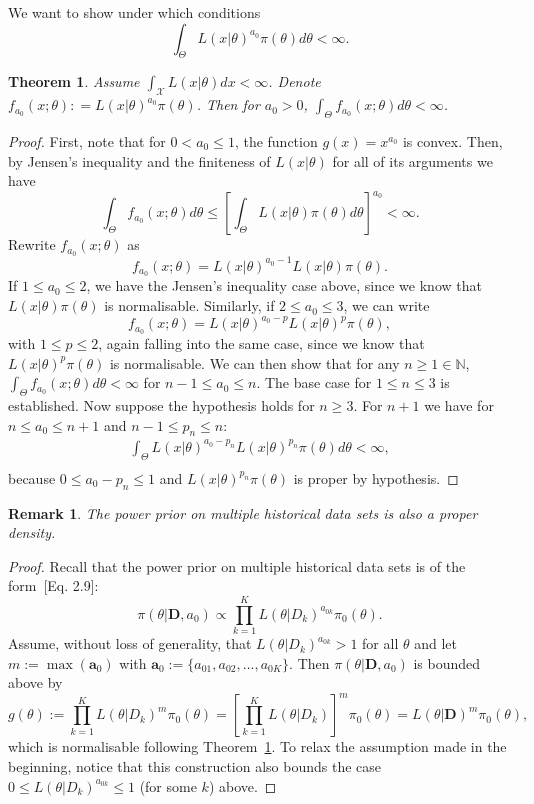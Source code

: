 \documentclass[a4paper, notitlepage, 11pt]{article}
\newtheorem{theorem}{Theorem}[]
\newtheorem{remark}{Remark}[]
\begin{document}
We want to show under which conditions
\[\int_{\Theta} L(x | \theta)^{a_0}\pi(\theta) d\theta <\infty.\]
\begin{theorem}
\label{thm:integrability}
 Assume $\int_{\mathcal{X}} L(x | \theta)dx < \infty$.
 Denote $f_{a_0}(x;\theta) : = L(x | \theta)^{a_0}\pi(\theta)$.
 Then for $a_0 > 0$, $\int_{\Theta} f_{a_0}(x;\theta) d\theta <\infty$.
\end{theorem}
\begin{proof}
First, note that for $0 < a_0 \leq 1$, the function $g(x) = x^{a_0}$ is convex.
Then, by Jensen's inequality and the finiteness of $L(x | \theta)$ for all of its arguments we have
\[ \int_{\Theta} f_{a_0}(x; \theta) d\theta \leq \left[ \int_{\Theta} L(x|\theta)\pi(\theta)d\theta \right]^{a_0} < \infty. \]
Rewrite $f_{a_0}(x; \theta)$ as
\[ f_{a_0}(x; \theta) = L(x|\theta)^{a_0 -1} L(x|\theta)\pi(\theta). \]
If $1 \leq a_0 \leq 2$, we have the Jensen's inequality case above, since we know that $L(x|\theta)\pi(\theta)$ is normalisable.
Similarly, if $2 \leq a_0 \leq 3$, we can write 
\[  f_{a_0}(x; \theta) = L(x|\theta)^{a_0-p} L(x|\theta)^p\pi(\theta), \]
with $1 \leq p \leq 2$, again falling into the same case, since we know that $L(x|\theta)^{p}\pi(\theta)$ is normalisable.
We can then show that for any $n \geq 1 \in \mathbb{N}$, $\int_{\Theta}f_{a_0}(x; \theta)d\theta < \infty$ for  $n-1 \leq a_0 \leq n$.
The base case for $1 \leq n \leq 3$ is established.
Now suppose the hypothesis holds for $n \geq 3$.
For $n + 1$ we have for $ n \leq  a_0 \leq n + 1$ and $n-1 \leq p_n \leq n$:
\begin{align*}
 \int_{\Theta} L(x|\theta)^{a_0-p_n} L(x|\theta)^{p_n}\pi(\theta)d\theta < \infty, \\
\end{align*}
because $0 \leq a_0 - p_n \leq 1$ and $L(x|\theta)^{p_n}\pi(\theta)$ is proper by hypothesis.
\end{proof}
\begin{remark}
 The power prior on multiple historical data sets is also a proper density.
\end{remark}
\begin{proof}
 Recall that the power prior on multiple historical data sets is of the form~[Eq. 2.9]\citep{Ibrahim2015}:
 \[ \pi(\theta | \boldsymbol D, a_0) \propto \prod_{k=1}^K L(\theta | D_k)^{a_{0k}} \pi_0(\theta). \]
Assume, without loss of generality, that $L(\theta |  D_k)^{a_{0k}} > 1$ for all $\theta$ and let $m := \max(\boldsymbol a_0)$ with $\boldsymbol a_0 := \{ a_{01}, a_{02}, \ldots, a_{0K}\}$.
Then $\pi(\theta | \boldsymbol D, a_0)$ is bounded above by 
\[  g(\theta) :=  \prod_{k=1}^K L(\theta | D_k)^{m} \pi_0(\theta) =  \left[ \prod_{k=1}^K L(\theta | D_k) \right]^m  \pi_0(\theta) = L(\theta | \boldsymbol D)^m \pi_0(\theta), \]
which is normalisable following Theorem~\ref{thm:integrability}.
To relax the assumption made in the beginning, notice that this construction also bounds the case $ 0 \leq  L(\theta |  D_k)^{a_{0k}} \leq 1$ (for some $k$) above.
\end{proof}
\end{document}
